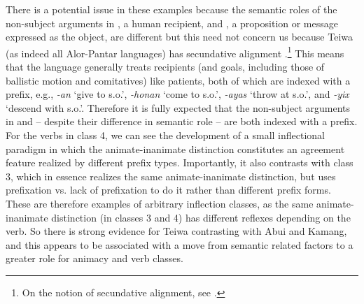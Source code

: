 There is a potential issue in these examples because the semantic roles of the non-subject arguments in , a human recipient, and , a proposition or message expressed as the object, are different but this need not concern us because Teiwa (as indeed all Alor-Pantar languages) has secundative alignment \citep[449, 454]{Klamer2010ditransitive}.\footnote{On the notion of secundative alignment,  see \citet{Dryer1986}.} This means that the language generally treats recipients (and goals, including those of ballistic motion and comitatives) like patients, both of which are indexed with a prefix, e.g., \textit{-an} `give to s.o.', \textit{-honan} `come to s.o.', \textit{-ayas} `throw at s.o.', and \textit{-yix} `descend with s.o.'. Therefore it is fully expected that the non-subject arguments in  and  -- despite their difference in semantic role -- are both indexed with a prefix. For the verbs in class 4, we can see the development of a small inflectional paradigm in which the animate-inanimate distinction constitutes an agreement feature realized by different prefix types. Importantly, it also contrasts with class 3, which in essence realizes the same animate-inanimate distinction, but uses prefixation vs. lack of prefixation to do it rather than different prefix forms. These are therefore examples of arbitrary inflection classes, as the same animate-inanimate distinction (in classes 3 and 4) has different reflexes depending on the verb. So there is strong evidence for Teiwa contrasting with Abui and Kamang, and this appears to be associated with a move from semantic related factors to a greater role for animacy and verb classes. 

